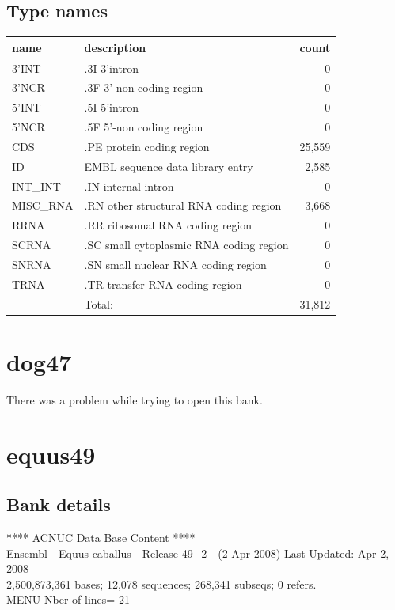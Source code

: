 \documentclass{article}
\begin{document}
\begin{Schunk}
\subsection{Type names}
\noindent\begin{tabular}{llr}
\hline \hline
name & description & count \\
\hline
3'INT  &  .3I 3'intron  &  0 \\
3'NCR  &  .3F  3'-non coding region  &  0 \\
5'INT  &  .5I 5'intron  &  0 \\
5'NCR  &  .5F  5'-non coding region  &  0 \\
CDS  &  .PE protein coding region  &  25,559 \\
ID  &  EMBL sequence data library entry  &  2,585 \\
INT\_INT  &  .IN  internal intron  &  0 \\
MISC\_RNA  &  .RN other structural RNA coding region  &  3,668 \\
RRNA  &  .RR ribosomal RNA coding region  &  0 \\
SCRNA  &  .SC small cytoplasmic RNA coding region  &  0 \\
SNRNA  &  .SN small nuclear RNA coding region  &  0 \\
TRNA  &  .TR transfer RNA coding region  &  0 \\
\hline
 & Total: & 31,812 \\
\hline \hline
\end{tabular}

\section{ dog47 }
There was a problem while trying to open this bank.
\section{ equus49 }
\subsection{Bank details}
             ****     ACNUC Data Base Content      ****                         \\
Ensembl - Equus caballus - Release 49\_2 - (2 Apr 2008) Last Updated: Apr  2, 2008\\
2,500,873,361 bases; 12,078 sequences; 268,341 subseqs; 0 refers.\\
MENU Nber of lines= 21                                                         


\end{Schunk}
\end{document}
